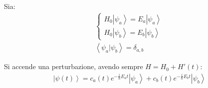 Sia:
\begin{equation}\begin{split}
\begin{cases}
H_0\left |\psi _a \right\rangle=E_a\left |\psi _a \right\rangle \\
H_0\left |\psi _b \right\rangle=E_b\left |\psi _b \right\rangle
\end{cases} \\
\left\langle \psi _a|\psi _b \right\rangle=\delta_{a,b}
\end{split}\end{equation}


Si accende una perturbazione, avendo sempre $H=H_0+H'\left(t\right)$:
\begin{equation}\begin{split}
\left |\psi \left(t\right) \right\rangle=c_a\left(t\right)e^{-\frac{i}{\hbar }E_at}\left |\psi _a \right\rangle+c_b\left(t\right)e^{-\frac{i}{\hbar }E_bt}\left |\psi _b \right\rangle
\end{split}\end{equation}

